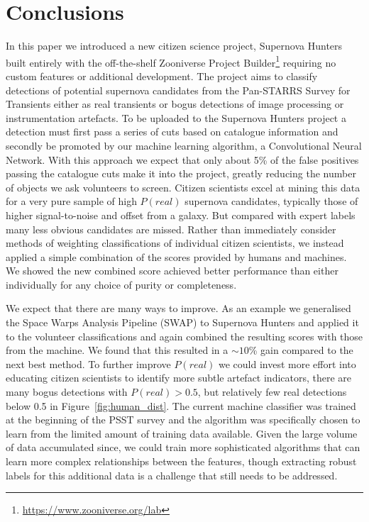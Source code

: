 \message{ !name(blank.tex)}\documentclass[a4paper,fleqn,usenatbib]{mnras}
\begin{document}
\section{Conclusions}
\label{sec:conclusions}


In this paper we introduced a new citizen science project, Supernova Hunters built entirely with the off-the-shelf Zooniverse Project Builder\footnote{\url{https://www.zooniverse.org/lab}} requiring no custom features or additional development.  The project aims to classify detections of potential supernova candidates from the Pan-STARRS Survey for Transients either as real transients or bogus detections of image processing or instrumentation artefacts.  To be uploaded to the Supernova Hunters project a detection must first pass a series of cuts based on catalogue information and secondly be promoted by our machine learning algorithm, a Convolutional Neural Network. With this approach we expect that only about 5\% of the false positives passing the catalogue cuts make it into the project, greatly reducing the number of objects we ask volunteers to screen.  Citizen scientists excel at mining this data for a very pure sample of high $P(real)$ supernova candidates, typically those of higher signal-to-noise and offset from a galaxy.  But compared with expert labels many less obvious candidates are missed.  Rather than immediately consider methods of weighting classifications of individual citizen scientists, we instead applied a simple combination of the scores provided by humans and machines.  We showed the new combined score achieved better performance than either individually for any choice of purity or completeness.

We expect that there are many ways to improve.  As an example we generalised the Space Warps Analysis Pipeline (SWAP) to Supernova Hunters and applied it to the volunteer classifications and again combined the resulting scores with those from the machine.  We found that this resulted in a $\sim10$\% gain compared to the next best method.  To further improve $P(real)$ we could invest more effort into educating citizen scientists to identify more subtle artefact indicators, there are many bogus detections with $P(real)>0.5$, but relatively few real detections below 0.5 in Figure~\ref{fig:human_dist}.  The current machine classifier was trained at the beginning of the PSST survey and the algorithm was specifically chosen to learn from the limited amount of training data available.  Given the large volume of data accumulated since, we could train more sophisticated algorithms that can learn more complex relationships between the features, though extracting robust labels for this additional data is a challenge that still needs to be addressed. 
\end{document}
